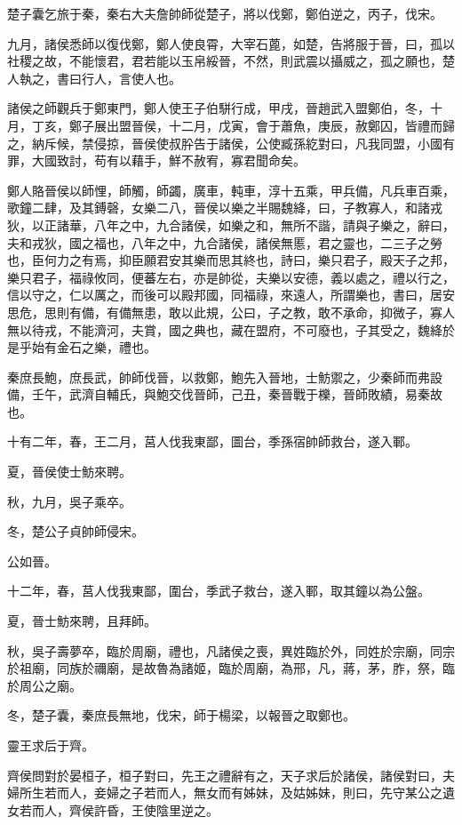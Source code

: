 \begin{pinyinscope}
楚子囊乞旅于秦，秦右大夫詹帥師從楚子，將以伐鄭，鄭伯逆之，丙子，伐宋。

九月，諸侯悉師以復伐鄭，鄭人使良霄，大宰石蓖，如楚，告將服于晉，曰，孤以社稷之故，不能懷君，君若能以玉帛綏晉，不然，則武震以攝威之，孤之願也，楚人執之，書曰行人，言使人也。

諸侯之師觀兵于鄭東門，鄭人使王子伯駢行成，甲戌，晉趙武入盟鄭伯，冬，十月，丁亥，鄭子展出盟晉侯，十二月，戊寅，會于蕭魚，庚辰，赦鄭囚，皆禮而歸之，納斥候，禁侵掠，晉侯使叔肸告于諸侯，公使臧孫紇對曰，凡我同盟，小國有罪，大國致討，苟有以藉手，鮮不赦宥，寡君聞命矣。

鄭人賂晉侯以師悝，師觸，師蠲，廣車，軘車，淳十五乘，甲兵備，凡兵車百乘，歌鐘二肆，及其鎛磬，女樂二八，晉侯以樂之半賜魏絳，曰，子教寡人，和諸戎狄，以正諸華，八年之中，九合諸侯，如樂之和，無所不諧，請與子樂之，辭曰，夫和戎狄，國之福也，八年之中，九合諸侯，諸侯無慝，君之靈也，二三子之勞也，臣何力之有焉，抑臣願君安其樂而思其終也，詩曰，樂只君子，殿天子之邦，樂只君子，福祿攸同，便蕃左右，亦是帥從，夫樂以安德，義以處之，禮以行之，信以守之，仁以厲之，而後可以殿邦國，同福祿，來遠人，所謂樂也，書曰，居安思危，思則有備，有備無患，敢以此規，公曰，子之教，敢不承命，抑微子，寡人無以待戎，不能濟河，夫賞，國之典也，藏在盟府，不可廢也，子其受之，魏絳於是乎始有金石之樂，禮也。

秦庶長鮑，庶長武，帥師伐晉，以救鄭，鮑先入晉地，士魴禦之，少秦師而弗設備，壬午，武濟自輔氏，與鮑交伐晉師，己丑，秦晉戰于櫟，晉師敗績，易秦故也。

十有二年，春，王二月，莒人伐我東鄙，圖台，季孫宿帥師救台，遂入鄆。

夏，晉侯使士魴來聘。

秋，九月，吳子乘卒。

冬，楚公子貞帥師侵宋。

公如晉。

十二年，春，莒人伐我東鄙，圍台，季武子救台，遂入鄆，取其鐘以為公盤。

夏，晉士魴來聘，且拜師。

秋，吳子壽夢卒，臨於周廟，禮也，凡諸侯之喪，異姓臨於外，同姓於宗廟，同宗於祖廟，同族於禰廟，是故魯為諸姬，臨於周廟，為邢，凡，蔣，茅，胙，祭，臨於周公之廟。

冬，楚子囊，秦庶長無地，伐宋，師于楊梁，以報晉之取鄭也。

靈王求后于齊。

齊侯問對於晏桓子，桓子對曰，先王之禮辭有之，天子求后於諸侯，諸侯對曰，夫婦所生若而人，妾婦之子若而人，無女而有姊妹，及姑姊妹，則曰，先守某公之遺女若而人，齊侯許昏，王使陰里逆之。


\end{pinyinscope}
